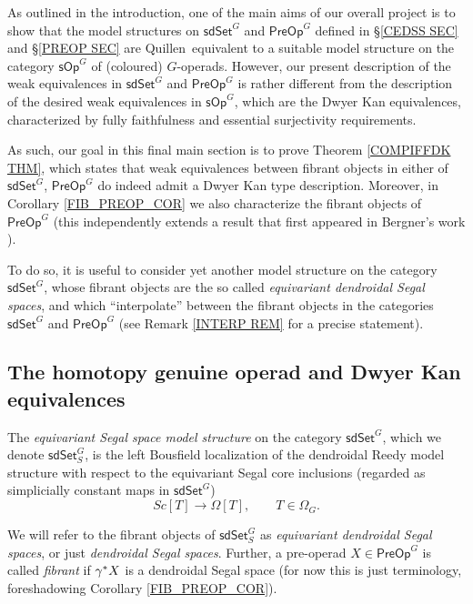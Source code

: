 \documentclass[a4paper,10pt
,draft
]{article}%
\begin{document}
As outlined in the introduction, one of the main aims of our overall project is to show that the model structures on 
$\mathsf{sdSet}^G$ and $\mathsf{PreOp}^G$
defined in \S \ref{CEDSS SEC} and \S \ref{PREOP SEC}
are Quillen\ equivalent to a suitable model structure on the category 
$\mathsf{sOp}^G$ of (coloured) $G$-operads.
However, our present description of the weak equivalences in 
$\mathsf{sdSet}^G$ and $\mathsf{PreOp}^G$
is rather different from the description of the desired weak equivalences in $\mathsf{sOp}^G$,
which are the Dwyer Kan equivalences, 
characterized by fully faithfulness and essential surjectivity requirements.

As such, our goal in this final main section is to prove
Theorem \ref{COMPIFFDK THM},
which states that weak equivalences between fibrant objects in either of 
$\mathsf{sdSet}^G$, $\mathsf{PreOp}^G$
do indeed admit a Dwyer Kan type description.
Moreover, in Corollary \ref{FIB_PREOP_COR} we also characterize the fibrant objects of $\mathsf{PreOp}^G$
(this independently extends a result that first appeared in Bergner's work \cite{Ber07}).

To do so, it is useful to consider yet another model structure on the category $\mathsf{sdSet}^G$,
whose fibrant objects are the so called
\textit{equivariant dendroidal Segal spaces},
and which ``interpolate''
between the fibrant objects 
in the categories $\mathsf{sdSet}^G$ and $\mathsf{PreOp}^G$ (see Remark \ref{INTERP REM} for a precise statement).




\subsection{The homotopy genuine operad and Dwyer Kan equivalences}\label{HMPTYGEN SEC}


\begin{definition}
	The \textit{equivariant Segal space model structure} on the category $\mathsf{sdSet}^G$, which we denote 
	$\mathsf{sdSet}^G_S$, 
	is the left Bousfield localization of the dendroidal Reedy model structure with respect to the equivariant Segal core inclusions 
	(regarded as simplicially constant maps in $\mathsf{sdSet}^G$)
\[
	Sc[T] \to \Omega[T], \qquad T \in \Omega_G.
\]
\end{definition}


\begin{notation}\label{FIB_PREOP_NOT}
We will refer to the fibrant objects of
$\mathsf{sdSet}^G_S$
as \textit{equivariant dendroidal Segal spaces}, 
or just \textit{dendroidal Segal spaces}.
Further, a pre-operad $X \in \mathsf{PreOp}^G$ is called \textit{fibrant}
if $\gamma^{\**}X$ is a dendroidal Segal space
(for now this is just terminology,
foreshadowing Corollary \ref{FIB_PREOP_COR}).
\end{notation}
\end{document}

